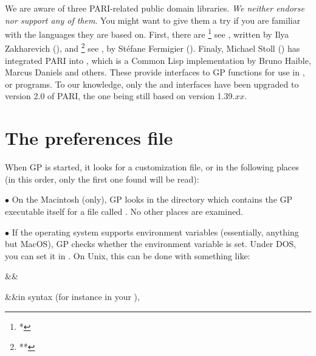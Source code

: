 
We are aware of three PARI-related public domain libraries. {\it We neither
endorse nor support any of them}. You might want to give them a try if you
are familiar with the languages they are based on. First, there are
%
\footnote{*}{
see },
%
written by Ilya Zakharevich (),
and %
\footnote{**}{
see },
%
by St\'efane Fermigier (). Finaly, Michael Stoll
() has integrated PARI into ,
which is a Common Lisp implementation by Bruno Haible, Marcus Daniels and
others. These provide interfaces to GP functions for use in ,
 or  programs.
To our knowledge, only the  and  interfaces have been
upgraded to version 2.0 of PARI, the  one being still based on
version 1.39.$xx$.

\section{The preferences file}
\label{se:gprc}

\noindent
When GP is started, it looks for a customization file, or  in the
following places (in this order, only the first one found will be read):

\noindent$\bullet$ On the Macintosh (only), GP looks in the directory which
contains the GP executable itself for a file called . No other places
are examined.

\noindent$\bullet$ If the operating system supports environment variables
(essentially, anything but MacOS), GP checks whether the environment variable
 is set. Under DOS, you can set it in .
On Unix, this can be done with something like:
\smallskip

\settabs\+\indent&\quad&\cr

\+&\quad&in  syntax
(for instance in your ),\cr

